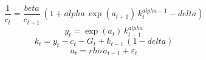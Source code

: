 \begin{dmath}
\frac{1}{{c}_{t}}=\frac{{beta}}{{c}_{t+1}}\, \left(1+{alpha}\, \exp\left({a}_{t+1}\right)\, {k}_{t}^{{alpha}-1}-{delta}\right)
\end{dmath}
\begin{dmath}
{y}_{t}=\exp\left({a}_{t}\right)\, {k}_{t-1}^{{alpha}}
\end{dmath}
\begin{dmath}
{k}_{t}={y}_{t}-{c}_{t}-{G}_{t}+{k}_{t-1}\, \left(1-{delta}\right)
\end{dmath}
\begin{dmath}
{a}_{t}={rho}\, {a}_{t-1}+{\varepsilon}_{t}
\end{dmath}
